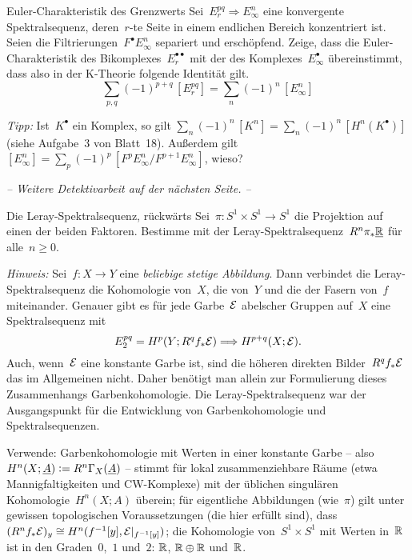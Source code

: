 \documentclass{uebblatt}
\begin{document}
\begin{aufgabe}{Euler-Charakteristik des Grenzwerts}
Sei~$E_r^{pq} \Rightarrow E^n_\infty$ eine konvergente Spektralsequenz,
deren~$r$-te Seite in einem endlichen Bereich konzentriert ist. Seien die
Filtrierungen~$F^\bullet E^n_\infty$ separiert und erschöpfend. Zeige, dass die
Euler-Charakteristik des Bikomplexes~$E_r^{\bullet\bullet}$ mit der des
Komplexes~$E_\infty^\bullet$ übereinstimmt, dass also in der K-Theorie folgende
Identität gilt.
\[ \sum_{p,q} (-1)^{p+q} \, [E_r^{pq}] = \sum_n (-1)^n \, [E_\infty^n] \]
{\tiny\emph{Tipp:} Ist~$K^\bullet$ ein Komplex, so gilt $\sum_n (-1)^n \, [K^n] =
\sum_n (-1)^n \, [H^n(K^\bullet)]$ (siehe Aufgabe~3 von Blatt~18). Außerdem gilt
$[E_\infty^n] = \sum_p (-1)^p \, [F^p E_\infty^n / F^{p+1} E_\infty^n]$, wieso?\par}
\end{aufgabe}

\begin{center}\emph{-- Weitere Detektivarbeit auf der nächsten Seite.
--}\end{center}
\newpage

\begin{aufgabe}{Die Leray-Spektralsequenz, rückwärts}
Sei~$\pi : S^1 \times S^1 \to S^1$ die Projektion auf einen der beiden
Faktoren. Bestimme mit der Leray-Spektralsequenz~$R^n \pi_* \underline{\mathbb{R}}$ für alle~$n
\geq 0$.

{\tiny\emph{Hinweis:}
Sei~$f : X \to Y$ eine \emph{beliebige stetige Abbildung}. Dann verbindet die
Leray-Spektralsequenz die Kohomologie von~$X$,
die von~$Y$ und die der Fasern von~$f$ miteinander. Genauer gibt es für jede
Garbe~$\mathcal{E}$ abelscher Gruppen auf~$X$ eine Spektralsequenz mit
\[ E_2^{pq} = H^p(Y; R^q f_* \mathcal{E}) \Longrightarrow H^{p+q}(X; \mathcal{E}). \]
Auch, wenn~$\mathcal{E}$ eine konstante Garbe ist, sind die höheren direkten Bilder~$R^q
f_* \mathcal{E}$ das im Allgemeinen nicht. Daher benötigt man allein zur Formulierung
dieses Zusammenhangs Garbenkohomologie. Die Leray-Spektralsequenz war der
Ausgangspunkt für die Entwicklung von Garbenkohomologie und
Spektralsequenzen.\par Verwende: Garbenkohomologie mit Werten in einer
konstante Garbe -- also $H^n(X; \underline{A}) \vcentcolon= R^n \Gamma_X(\underline{A})$ -- stimmt
für lokal zusammenziehbare Räume (etwa Mannigfaltigkeiten und CW-Komplexe) mit
der üblichen singulären Kohomologie~$H^n(X; A)$ überein; für eigentliche
Abbildungen (wie~$\pi$) gilt unter gewissen topologischen Voraussetzungen (die
hier erfüllt sind), dass~$(R^n f_* \mathcal{E})_y \cong H^n(f^{-1}[y],
\mathcal{E}|_{f^{-1}[y]})$; die Kohomologie von~$S^1 \times S^1$ mit Werten in~$\mathbb{R}$
ist in den Graden~$0$,~$1$ und~$2$: $\mathbb{R}$, $\mathbb{R} \oplus \mathbb{R}$ und~$\mathbb{R}$.\par}
\end{aufgabe}
\end{document}
